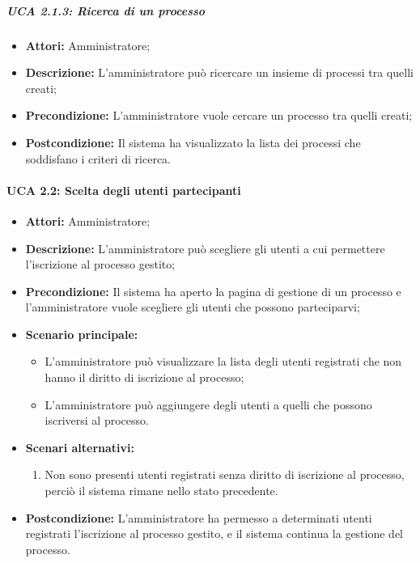 \subparagraph{UCA 2.1.3: Ricerca di un processo}
\begin{itemize}
\item \textbf{Attori:} Amministratore;
\item \textbf{Descrizione:} L'amministratore può ricercare un insieme di processi tra quelli creati;
\item \textbf{Precondizione:} L'amministratore vuole cercare un processo tra quelli creati;
\item \textbf{Postcondizione:} Il sistema ha visualizzato la lista dei processi che soddisfano i criteri di ricerca.
\end{itemize}

\paragraph{UCA 2.2: Scelta degli utenti partecipanti}
\begin{itemize}
\item \textbf{Attori:}
 Amministratore;
\item \textbf{Descrizione:} 
L'amministratore può scegliere gli utenti a cui permettere l'iscrizione al processo gestito;
\item \textbf{Precondizione:} 
Il sistema ha aperto la pagina di gestione di un processo e l'amministratore vuole scegliere gli utenti che possono parteciparvi;
\item \textbf{Scenario principale:} 
\begin{itemize}
\item L'amministratore può visualizzare la lista degli utenti registrati che non hanno il diritto di iscrizione al processo;
\item L'amministratore può aggiungere degli utenti a quelli che possono iscriversi al processo.
\end{itemize}
\item \textbf{Scenari alternativi:}
\begin{enumerate}
\item Non sono presenti utenti registrati senza diritto di iscrizione al processo, perciò il sistema rimane nello stato precedente.
\end{enumerate}
\item \textbf{Postcondizione:} 
L'amministratore ha permesso a determinati utenti registrati l'iscrizione al processo gestito, e il sistema continua la gestione del processo.
\end{itemize}

